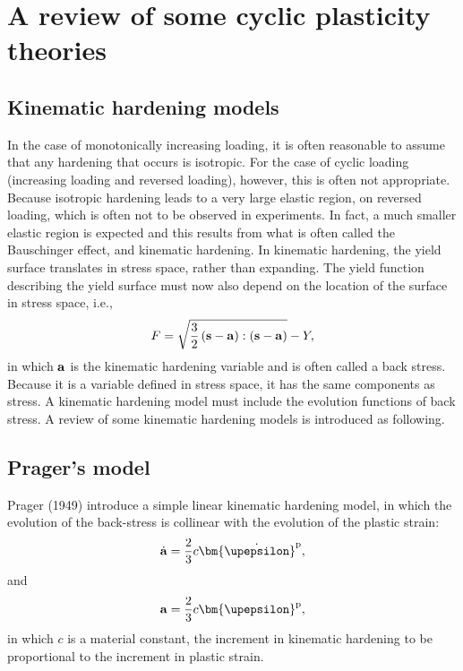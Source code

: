 \section{A review of some cyclic plasticity theories}
\subsection{Kinematic hardening models}
\noindent
In the case of monotonically increasing loading, it is often reasonable to assume that any hardening that occurs is isotropic.
For the case of cyclic loading (increasing loading and reversed loading), however, this is often not appropriate.
Because isotropic hardening leads to a very large elastic region, on reversed loading, which is often not to be observed in experiments.
In fact, a much smaller elastic region is expected and this results from what is often called the Bauschinger effect, and
kinematic hardening.
In kinematic hardening, the yield surface translates in stress space, rather than expanding.
The yield function describing the yield surface must now also depend on the location of the surface in stress space, i.e.,
\begin{equation}
F = \sqrt {\frac{3}{2}\left( {{\bf{s}} - {\bf{a}}} \right):\left( {{\bf{s}} - {\bf{a}}} \right)}  - Y,
\end{equation}
in which $\bf{a}$ is the kinematic hardening variable and is often called a back stress.
Because it is a variable defined in stress space, it has the same components as stress.
A kinematic hardening model must include the evolution functions of back stress.
A review of some kinematic hardening models is introduced as following.

\subsection{Prager's model}
\noindent
Prager (1949) \cite{prager1949recent} introduce a simple linear kinematic hardening model, in which the evolution of the back-stress is collinear with the evolution of the plastic strain:
\begin{equation}
{\dot{\bf a}} = \frac{2}{3}c{\bm{\dot \upepsilon }}^{\rm{p}},
\end{equation}
and
\begin{equation}
{\bf{ a}} = \frac{2}{3}c{\bm{ \upepsilon }}^{\rm{p}},
\end{equation}
in which $c$ is a material constant, the increment in kinematic hardening to be proportional to the increment
in plastic strain.

